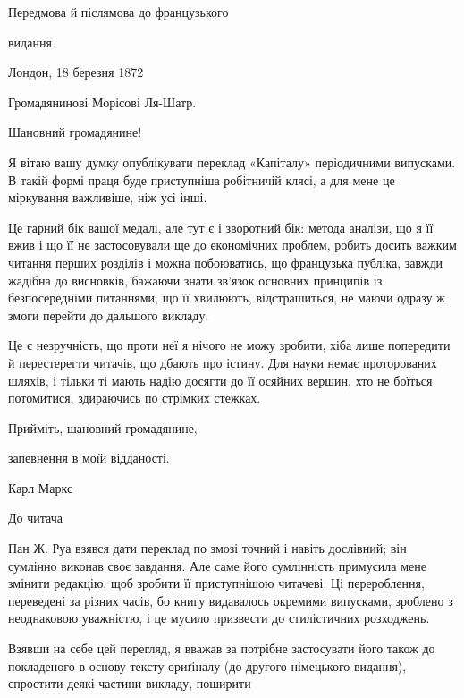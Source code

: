 Передмова й післямова до французького

видання

Лондон, 18 березня 1872

Громадянинові Морісові Ля-Шатр.

Шановний громадянине!

Я вітаю вашу думку опублікувати переклад «Капіталу» періодичними
випусками. В такій формі праця буде приступніша
робітничій клясі, а для мене це міркування важливіше, ніж
усі інші.

Це гарний бік вашої медалі, але тут є і зворотний бік: метода
аналізи, що я її вжив і що її не застосовували ще до економічних
проблем, робить досить важким читання перших розділів і можна
побоюватись, що французька публіка, завжди жадібна до висновків,
бажаючи знати зв’язок основних принципів із безпосередніми
питаннями, що її хвилюють, відстрашиться, не маючи одразу ж
змоги перейти до дальшого викладу.

Це є незручність, що проти неї я нічого не можу зробити, хіба
лише попередити й перестерегти читачів, що дбають про істину.
Для науки немає проторованих шляхів, і тільки ті мають надію
досягти до її осяйних вершин, хто не боїться потомитися, здираючись
по стрімких стежках.

Прийміть, шановний громадянине,

запевнення в моїй відданості.

Карл Маркс

До читача

Пан Ж. Руа взявся дати переклад по змозі точний і навіть
дослівний; він сумлінно виконав своє завдання. Але саме його
сумлінність примусила мене змінити редакцію, щоб зробити її
приступнішою читачеві. Ці перероблення, переведені за різних
часів, бо книгу видавалось окремими випусками, зроблено з
неоднаковою уважністю, і це мусило призвести до стилістичних
розходжень.

Взявши на себе цей перегляд, я вважав за потрібне застосувати
його також до покладеного в основу тексту ориґіналу (до другого
німецького видання), спростити деякі частини викладу, поширити
